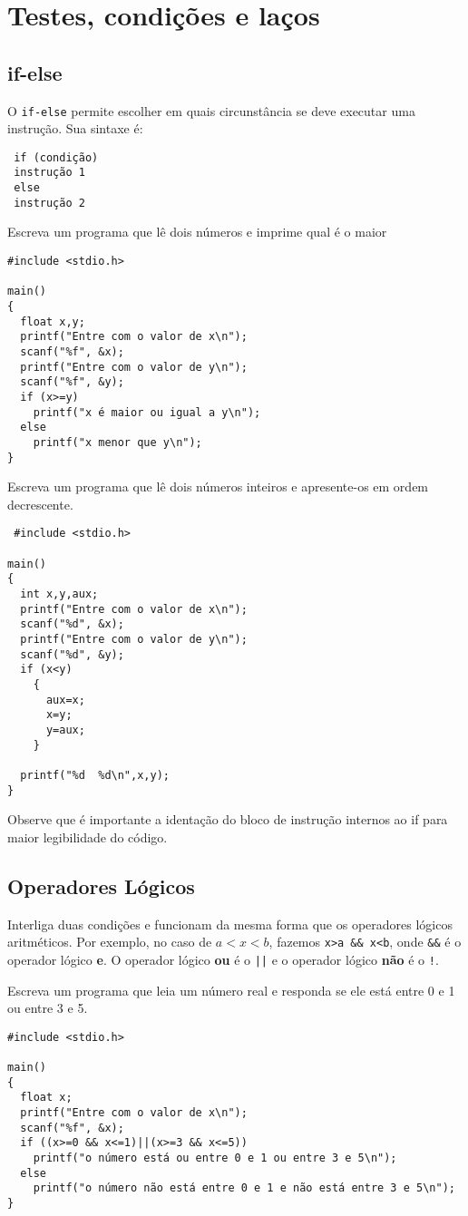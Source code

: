 \chapter{Testes, condições e laços}
\section{if-else}
O \verb|if-else| permite escolher em quais circunstância se deve executar uma instrução. Sua sintaxe é: 
\begin{verbatim}
 if (condição)
 instrução 1
 else
 instrução 2
\end{verbatim}
\begin{ex}\label{ex5}Escreva um programa que lê dois números e imprime qual é o maior
 
\end{ex}

\begin{verbatim}
#include <stdio.h>

main()
{
  float x,y;
  printf("Entre com o valor de x\n");
  scanf("%f", &x);
  printf("Entre com o valor de y\n");
  scanf("%f", &y);
  if (x>=y)
    printf("x é maior ou igual a y\n");
  else
    printf("x menor que y\n");
}
\end{verbatim}
\begin{ex}\label{ex6}Escreva um programa que lê dois números inteiros e apresente-os em ordem decrescente.
\end{ex}
\begin{verbatim}
 #include <stdio.h>

main()
{
  int x,y,aux;
  printf("Entre com o valor de x\n");
  scanf("%d", &x);
  printf("Entre com o valor de y\n");
  scanf("%d", &y);
  if (x<y)
    {
      aux=x;
      x=y;
      y=aux;
    }

  printf("%d  %d\n",x,y);
}
\end{verbatim}
Observe que é importante a identação do bloco de instrução internos ao if para maior legibilidade do código.

\section{Operadores Lógicos}
Interliga duas condições e funcionam da mesma forma que os operadores lógicos aritméticos. Por exemplo, no caso de $a<x<b$, fazemos \verb|x>a && x<b|, onde \verb|&&| é o operador lógico {\bf e}. O operador lógico {\bf ou} é o \verb!||! e o operador lógico {\bf não} é o \verb|!|.
\begin{ex}\label{ex7} Escreva um programa que leia um número real e responda se ele está entre 0 e 1 ou entre 3 e 5.
\end{ex}
\begin{verbatim}
#include <stdio.h>

main()
{
  float x;
  printf("Entre com o valor de x\n");
  scanf("%f", &x);
  if ((x>=0 && x<=1)||(x>=3 && x<=5))
    printf("o número está ou entre 0 e 1 ou entre 3 e 5\n");
  else
    printf("o número não está entre 0 e 1 e não está entre 3 e 5\n");
}
\end{verbatim}


